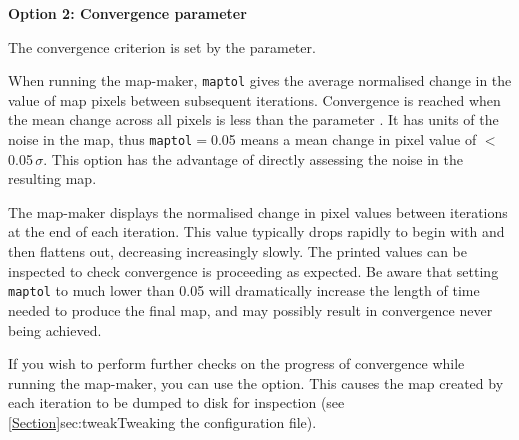\textbf{Option 2: Convergence parameter}

The convergence criterion is set by the  parameter.

When running the map-maker, \texttt{maptol} gives the average
normalised change in the value of map pixels
between subsequent iterations. Convergence is reached when the  mean
change across all pixels is less than the parameter .
It has units of the noise in the map, thus \texttt{maptol}$=$0.05 means
a mean change in pixel value of $<$0.05\,$\sigma$. This option has the
advantage of directly assessing the noise in the resulting map.

The map-maker displays the normalised change in pixel values between
iterations at the end of each iteration. This value typically drops
rapidly to begin with and then flattens out, decreasing increasingly
slowly.  The printed values can be inspected to check convergence is
proceeding as expected. Be aware that setting \texttt{maptol} to much
lower than 0.05 will dramatically increase the length of time needed to
produce the final map, and may possibly result in convergence never being
achieved.

If you wish to perform further checks on the progress of convergence
while running the map-maker, you can use the 
option. This causes the map created by each iteration to be dumped to
disk for inspection (see \cref{Section}{sec:tweak}{Tweaking the
configuration file}).

